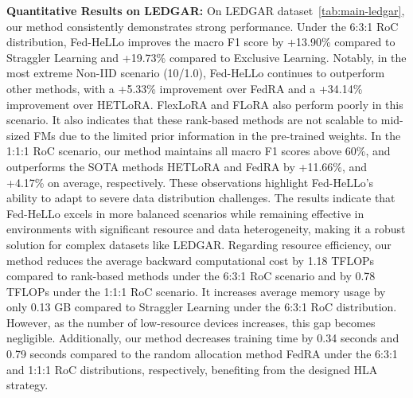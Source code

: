 \documentclass[lettersize,journal]{IEEEtran}
\begin{document}
\textbf{Quantitative Results on LEDGAR:} On LEDGAR dataset~\ref{tab:main-ledgar}, our method consistently demonstrates strong performance. Under the 6:3:1 RoC distribution, Fed-HeLLo improves the macro F1 score by +13.90\% compared to Straggler Learning and +19.73\% compared to Exclusive Learning. Notably, in the most extreme Non-IID scenario (10/1.0), Fed-HeLLo continues to outperform other methods, with a +5.33\% improvement over FedRA and a +34.14\% improvement over HETLoRA. {FlexLoRA and FLoRA also perform poorly in this scenario. It also indicates that these rank-based methods are not scalable to mid-sized FMs due to the limited prior information in the pre-trained weights.}
In the 1:1:1 RoC scenario, our method maintains all macro F1 scores above 60\%, and outperforms the SOTA methods HETLoRA and FedRA by +11.66\%, and +4.17\% on average, respectively.
These observations highlight Fed-HeLLo's ability to adapt to severe data distribution challenges. The results indicate that Fed-HeLLo excels in more balanced scenarios while remaining effective in environments with significant resource and data heterogeneity, making it a robust solution for complex datasets like LEDGAR. {Regarding resource efficiency, our method reduces the average backward computational cost by 1.18 TFLOPs compared to rank-based methods under the 6:3:1 RoC scenario and by 0.78 TFLOPs under the 1:1:1 RoC scenario. It increases average memory usage by only 0.13 GB compared to Straggler Learning under the 6:3:1 RoC distribution. However, as the number of low-resource devices increases, this gap becomes negligible. Additionally, our method decreases training time by 0.34 seconds and 0.79 seconds compared to the random allocation method FedRA under the 6:3:1 and 1:1:1 RoC distributions, respectively, benefiting from the designed HLA strategy.
}
\end{document}
